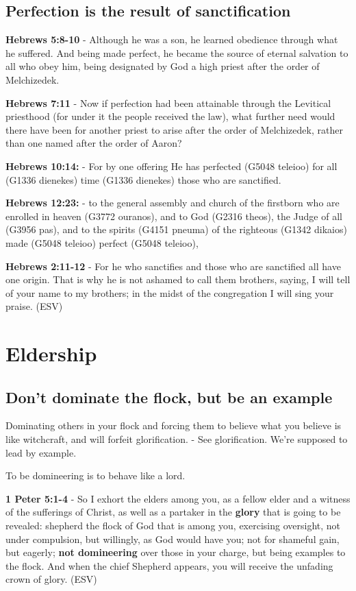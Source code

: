 \documentclass[11pt]{article}
\begin{document}
\subsection{Perfection is the result of sanctification}
\label{sec:org85899eb}

\textbf{Hebrews 5:8-10} - Although he was a son, he learned obedience through what he suffered. And being made perfect, he became the source of eternal salvation to all who obey him, being designated by God a high priest after the order of Melchizedek.

\textbf{Hebrews 7:11} - Now if perfection had been attainable through the Levitical priesthood (for under it the people received the law), what further need would there have been for another priest to arise after the order of Melchizedek, rather than one named after the order of Aaron?

\textbf{Hebrews 10:14:} - For by one offering He has perfected (G5048 teleioo) for all (G1336 dienekes) time (G1336 dienekes) those who are sanctified.

\textbf{Hebrews 12:23:} - to the general assembly and church of the firstborn who are enrolled in heaven (G3772 ouranos), and to God (G2316 theos), the Judge of all (G3956 pas), and to the spirits (G4151 pneuma) of the righteous (G1342 dikaios) made (G5048 teleioo) perfect (G5048 teleioo),

\textbf{Hebrews 2:11-12} -  For he who sanctifies and those who are sanctified all have one origin.  That is why he is not ashamed to call them brothers, saying, I will tell of your name to my brothers; in the midst of the congregation I will sing your praise.  (ESV)

\section{Eldership}
\label{sec:org40bd80a}
\subsection{Don't dominate the flock, but be an example}
\label{sec:orgcbdedc9}
Dominating others in your flock and forcing them to believe what you believe is like witchcraft, and will forfeit glorification. - See glorification.
We're supposed to lead by example.

To be domineering is to behave like a lord.

\textbf{1 Peter 5:1-4} - So I exhort the elders among you, as a fellow elder and a witness of the sufferings of Christ, as well as a partaker in the \textbf{glory} that is going to be revealed: shepherd the flock of God that is among you, exercising oversight, not under compulsion, but willingly, as God would have you; not for shameful gain, but eagerly; \textbf{not domineering} over those in your charge, but being examples to the flock. And when the chief Shepherd appears, you will receive the unfading crown of glory. (ESV)
\end{document}
